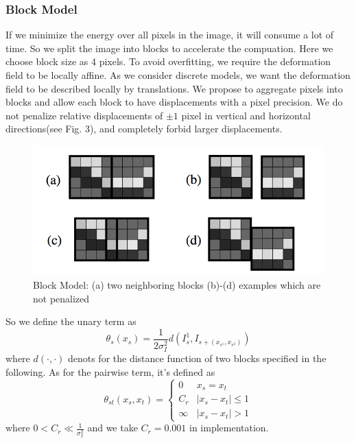 \documentclass{article} %
\begin{document}
		\subsubsection{Block Model}
			If we minimize the energy over all pixels in the image, it will consume a lot of time. So we split the image into blocks to accelerate the compuation. Here we choose block size as 4 pixels. To avoid overfitting, we require the deformation field to be locally affine. As we consider discrete models, we want the deformation field to be described locally by translations. We propose to aggregate pixels into blocks and allow each block to have displacements with a pixel precision. We do not penalize relative displacements of $\pm 1$ pixel in vertical and horizontal directions(see Fig. 3), and completely forbid larger displacements.
			\begin{figure}[!hb]
			\centering
			\includegraphics[scale = 0.85]{block.png}
			\caption{Block Model: (a) two neighboring blocks (b)-(d) examples which are not penalized}
			\end{figure}
			So we define the unary term as 
			\begin{equation}
				\theta_s(x_s) = \frac{1}{2\sigma_I^2} d(I_s^1, I_{s+(x_{s^1}, x_{s^2})})
			\end{equation}
			where $d(\cdot,\cdot)$ denots for the distance function of two blocks specified in the following. As for the pairwise term, it's defined as
			\begin{equation}
				\theta_{st}(x_s, x_t) = \left\{\begin{array}{ll}
				0 & x_s = x_t \\
				C_r & |x_s - x_t| \leqslant 1\\
				\infty & |x_s - x_t| > 1
				\end{array}\right.
			\end{equation}
			where $\displaystyle{0 < C_r \ll \frac{1}{\sigma_I^2}}$ and we take $C_r = 0.001$ in implementation.
\end{document}
